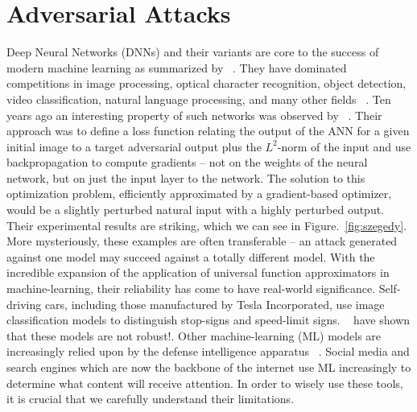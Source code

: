 \chapter{Adversarial Attacks}

\label{Chapter2} %

Deep Neural Networks (DNNs) and their variants are core to the success
of modern machine learning as summarized by ~\citet{prakash2018}. They
have dominated competitions in image processing, optical character
recognition, object detection, video classification, natural language
processing, and many other fields ~\citep{SCHMIDHUBER201585}. Ten years
ago an interesting property of
such networks was observed by ~\citet{szegedy2013}. Their approach was to define a loss function
relating the output of the ANN for a given initial image to a target adversarial 
output plus the $L^2$-norm of the input and use backpropagation to
compute gradients -- not on the weights of the neural network, but on
just the input layer to the network. The solution to this optimization
problem, efficiently approximated by a gradient-based optimizer, would
be a slightly perturbed natural input with a highly perturbed
output. Their experimental results are striking, which we can see in
Figure.~\ref{fig:szegedy}.  More mysteriously, these examples
are often transferable -- an attack generated against one
model may succeed against a totally different model. With the
incredible expansion of the application of universal function
approximators in machine-learning, their reliability has come to have
real-world significance. Self-driving cars, including those
manufactured by Tesla Incorporated, use image classification models to
distinguish stop-signs and speed-limit
signs. ~\citet{DBLP:journals/corr/EvtimovEFKLPRS17} have shown that
these models are not robust!. Other machine-learning (ML) models are
increasingly relied upon by the defense intelligence apparatus
~\citep{hutchins2011intelligence}. Social media and search engines
which are now the backbone of the internet use ML increasingly
to determine what content will receive attention. In order to wisely
use these tools, it is crucial that we carefully understand their
limitations. 

